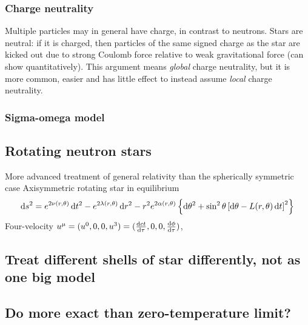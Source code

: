 \subsubsection{Charge neutrality}

Multiple particles may in general have charge, in contrast to neutrons.
Stars are neutral: if it is charged, then particles of the same signed charge as the star are kicked out due to strong Coulomb force relative to weak gravitational force (can show quantitatively).
This argument means \emph{global} charge neutrality, but it is more common, easier and has little effect to instead assume \emph{local} charge neutrality.

\subsubsection*{Sigma-omega model}

\subsubsection*{}

\subsection*{Rotating neutron stars}

More advanced treatment of general relativity than the spherically symmetric case
Axisymmetric rotating star in equilibrium
\cite[section 6]{ref:glendenning}
\begin{equation}
	\mathop{}\!\mathrm{d} s^2 = e^{2\nu(r,\theta)} \mathop{}\!\mathrm{d} t^2 - e^{2\lambda(r,\theta)} \mathop{}\!\mathrm{d} r^2 - r^2 e^{2 \alpha(r,\theta)} \left\{ \mathop{}\!\mathrm{d} \theta^2 + \sin^2 \theta \left[ \mathop{}\!\mathrm{d} \theta - L(r,\theta) \mathop{}\!\mathrm{d} t \right]^2 \right\}
\end{equation}
Four-velocity $u^\mu = (u^0, 0, 0, u^3) = (\odv{ct}{\tau}, 0, 0, \odv{\phi}{\tau})$,  

\subsection*{Treat different shells of star differently, not as one big model}

\subsection*{Do more exact than zero-temperature limit?}

